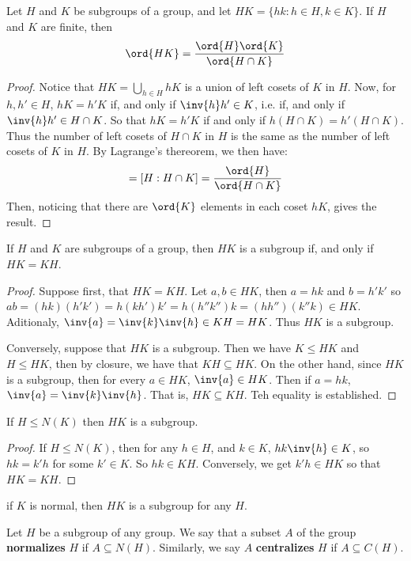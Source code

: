 \begin{theorem}\label{3.3.6}
    Let $H$ and  $K$ be subgroups of a group, and let  $HK=\{hk : h \in H, k \in
    K\}$. If $H$ and $K$ are finite, then
    \begin{equation}
        \ord{HK}=\frac{\ord{H}\ord{K}}{\ord{H \cap K}}
    \end{equation}
\end{theorem}
\begin{proof}
    Notice that $HK=\bigcup_{h \in H}{hK}$ is a union of left cosets of $K$ in
    $H$. Now, for  $h,h' \in H$,  $hK=h'K$ if, and only if  $\inv{h}h' \in K$,
    i.e. if, and only if $\inv{h}h' \in H \cap K$. So that $hK=h'K$ if and only
    if  $h(H \cap K)=h'(H \cap K)$. Thus the number of left cosets of $H \cap K$
    in $H$ is the same as the number of left cosets of  $K$ in  $H$. By
    Lagrange's thereorem, we then have:
    \begin{equation*}
        [H:K]=[H: H \cap K]=\frac{\ord{H}}{\ord{H \cap K}}
    \end{equation*}
    Then, noticing that there are $\ord{K}$ elements in each coset $hK$, gives
    the result.
\end{proof}

\begin{lemma}\label{3.3.7}
    If $H$ and $K$ are subgroups of a group, then $HK$ is a subgroup if, and
    only if  $HK=KH$.
\end{lemma}
\begin{proof}
    Suppose first, that $HK=KH$. Let $a,b \in HK$, then $a=hk$ and  $b=h'k'$ so
     $ab=(hk)(h'k')=h(kh')k'=h(h''k'')k=(hh'')(k''k) \in HK$. Aditionaly,
     $\inv{a}=\inv{k}\inv{h} \in KH=HK$. Thus $HK$ is a subgroup.

     Conversely, suppose that  $HK$ is a subgroup. Then we have  $K \leq HK$ and
      $H \leq HK$, then by closure, we have that  $KH \subseteq HK$. On the
      other hand, since  $HK$ is a subgroup, then for every  $a \in HK$,
      $\inv{a} \in HK$. Then if $a=hk$,  $\inv{a}=\inv{k}\inv{h}$. That is, $HK
      \subseteq KH$. Teh equality is established.
\end{proof}
\begin{corollary}
    If $H \leq N(K)$ then $HK$ is a subgroup.
\end{corollary}
\begin{proof}
    If $H \leq N(K)$, then for any $h \in H$, and  $k \in K$,  $hk\inv{h} \in
    K$, so $hk=k'h$ for some  $k' \in K$. So  $hk \in KH$. Conversely, we get
    $k'h \in HK$ so that  $HK=KH$.
\end{proof}
\begin{corollary}
    if $K$ is normal, then $HK$ is a subgroup for any $H$.
\end{corollary}

\begin{definition}
    Let $H$ be a subgroup of any group. We say that a subset $A$ of the group
    \textbf{normalizes} $H$ if  $A \subseteq N(H)$. Similarly, we say $A$
    \textbf{centralizes} $H$ if  $A \subseteq C(H)$.
\end{definition}
